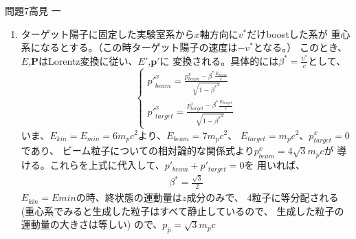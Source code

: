 \documentclass[fleqn]{jbook}
\begin{document}
\begin{answer}{問題7}{高見 一}
\begin{enumerate}
\item
ターゲット陽子に固定した実験室系から$x$軸方向に$v^*$だけboostした系が
重心系になるとする。（この時ターゲット陽子の速度は$-v^*$となる。）
このとき、$E$,$\textbf{P}$はLorentz変換に従い、$E'$,$\textbf{p}'$に
変換される。具体的には$\beta^* = \frac{v^*}{c}$として、
\[ \displaystyle 
\left\{
\begin{array}{cc}
{p'}_{beam}^x = \frac{p_{beam}^x - \beta^* \frac{E_{beam}}{c}}
{\sqrt{1 - {\beta^*}^2}} \\
{p'}_{target}^x = \frac{p_{target}^x - \beta^* \frac{E_{target}}{c}}
{\sqrt{1 - {\beta^*}^2}} 
\end{array}
\right.
\]
いま、$E_{kin} = E_{min} = 6 m_p c^2$より、$E_{beam} = 7 m_p c^2$、
$E_{target} = m_p c^2$、$p_{target}^x = 0$であり、
ビーム粒子についての相対論的な関係式より$p_{beam}^x = 4 \sqrt{3}m_p c$が
導ける。これらを上式に代入して、$p'_{beam} + p'_{target} = 0$を
用いれば、
\begin{eqnarray*}
\beta^* = \frac{\sqrt{3}}{2}
\end{eqnarray*}
$E_{kin} = E{min}$の時、終状態の運動量は$z$成分のみで、
4粒子に等分配される(重心系でみると生成した粒子はすべて静止しているので、
生成した粒子の運動量の大きさは等しい)
ので、$p_{\bar{p}} = \sqrt{3} m_p c$
\end{enumerate}
\end{answer}
\end{document}
